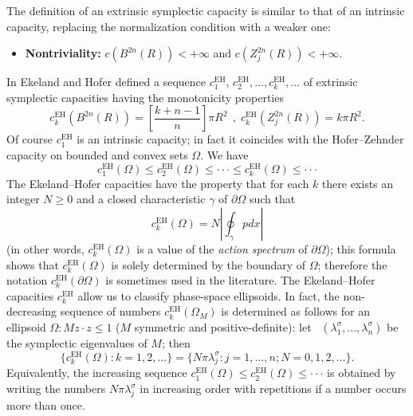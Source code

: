 \documentclass[11pt]{article}%
\begin{document}
The definition of an extrinsic symplectic capacity is similar to that of an
intrinsic capacity, replacing the normalization condition with a weaker one:

\begin{itemize}
\item \textbf{Nontriviality:} $c(B^{2n}(R))<+\infty$ and $c(Z_{j}%
^{2n}(R))<+\infty$.
\end{itemize}

In \cite{EH} Ekeland and Hofer defined a sequence $c_{1}^{\mathrm{EH}}$,
$c_{2}^{\mathrm{EH}},...,c_{k}^{\mathrm{EH}},...$ of extrinsic symplectic
capacities having the monotonicity properties%
\begin{equation}
c_{k}^{\mathrm{EH}}(B^{2n}(R))=\left[  \frac{k+n-1}{n}\right]  \pi
R^{2}\ \ \text{,}\ \ c_{k}^{\mathrm{EH}}(Z_{j}^{2n}(R))=k\pi R^{2}. \label{eh}%
\end{equation}
Of course $c_{1}^{\mathrm{EH}}$ is an intrinsic capacity; in fact it coincides
with the Hofer--Zehnder capacity on bounded and convex sets $\Omega$. We have%
\begin{equation}
c_{1}^{\text{EH}}(\Omega)\leq c_{2}^{\text{EH}}(\Omega)\leq\cdot\cdot\cdot\leq
c_{k}^{\text{EH}}(\Omega)\leq\cdot\cdot\cdot\tag{A8}%
\end{equation}
The Ekeland--Hofer capacities have the property that for each $k$ there exists
an integer $N\geq0$ and a closed characteristic $\gamma$ of $\partial\Omega$
such that%
\begin{equation}
c_{k}^{\text{EH}}(\Omega)=N\left\vert \oint\nolimits_{\gamma}pdx\right\vert
\label{acspec}%
\end{equation}
(in other words, $c_{k}^{\text{EH}}(\Omega)$ is a value of the \textit{action
spectrum} of $\partial\Omega$); this formula shows that $c_{k}^{\text{EH}%
}(\Omega)$ is solely determined by the boundary of $\Omega$; therefore the
notation $c_{k}^{\text{EH}}(\partial\Omega)$ is sometimes used in the
literature. The Ekeland--Hofer capacities $c_{k}^{\text{EH}}$ allow us to
classify phase-space ellipsoids. In fact, the non-decreasing sequence of
numbers $c_{k}^{\text{EH}}(\Omega_{M})$ is determined as follows for an
ellipsoid $\Omega:Mz\cdot z\leq1$ ($M$ symmetric and positive-definite): let
\ $(\lambda_{1}^{\sigma},...,\lambda_{n}^{\sigma})$ be the symplectic
eigenvalues of $M$; then
\begin{equation}
\{c_{k}^{\text{EH}}(\Omega):k=1,2,...\}=\{N\pi\lambda_{j}^{\sigma
}:j=1,...,n;N=0,1,2,...\}. \label{cehc}%
\end{equation}
Equivalently, the increasing sequence $c_{1}^{\text{EH}}(\Omega)\leq
c_{2}^{\text{EH}}(\Omega)\leq\cdot\cdot\cdot$ is obtained by writing the
numbers $N\pi\lambda_{j}^{\sigma}$ in increasing order with repetitions if a
number occurs more than once.
\end{document}
